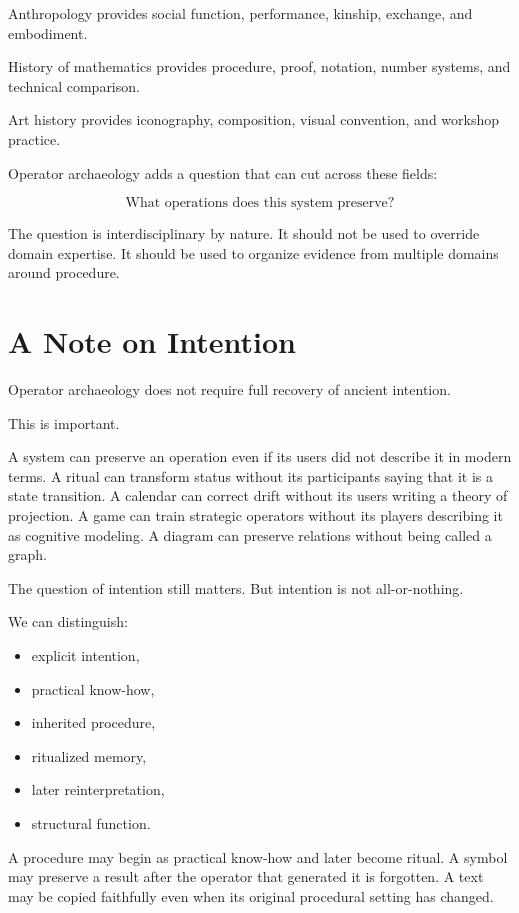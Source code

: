 \documentclass[11pt]{book}
\begin{document}
Anthropology provides social function, performance, kinship, exchange, and embodiment.

History of mathematics provides procedure, proof, notation, number systems, and technical comparison.

Art history provides iconography, composition, visual convention, and workshop practice.

Operator archaeology adds a question that can cut across these fields:

\[
\text{What operations does this system preserve?}
\]

The question is interdisciplinary by nature. It should not be used to override domain expertise. It should be used to organize evidence from multiple domains around procedure.

\section{A Note on Intention}

Operator archaeology does not require full recovery of ancient intention.

This is important.

A system can preserve an operation even if its users did not describe it in modern terms. A ritual can transform status without its participants saying that it is a state transition. A calendar can correct drift without its users writing a theory of projection. A game can train strategic operators without its players describing it as cognitive modeling. A diagram can preserve relations without being called a graph.

The question of intention still matters. But intention is not all-or-nothing.

We can distinguish:

\begin{itemize}
    \item explicit intention,
    \item practical know-how,
    \item inherited procedure,
    \item ritualized memory,
    \item later reinterpretation,
    \item structural function.
\end{itemize}

A procedure may begin as practical know-how and later become ritual. A symbol may preserve a result after the operator that generated it is forgotten. A text may be copied faithfully even when its original procedural setting has changed.
\end{document}
